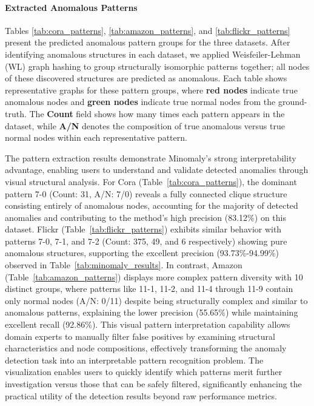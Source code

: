 \documentclass[pdflatex,sn-mathphys-num]{sn-jnl}%
\theoremstyle{thmstyleone}%
\theoremstyle{thmstyletwo}%
\theoremstyle{thmstylethree}%
\begin{document}
\paragraph{Extracted Anomalous Patterns}
Tables \ref{tab:cora_patterns}, \ref{tab:amazon_patterns}, and \ref{tab:flickr_patterns} present the predicted anomalous pattern groups for the three datasets. After identifying anomalous structures in each dataset, we applied Weisfeiler-Lehman (WL) graph hashing to group structurally isomorphic patterns together; all nodes of these discovered structures are predicted as anomalous. Each table shows representative graphs for these pattern groups, where \textbf{red nodes} indicate true anomalous nodes and \textbf{green nodes} indicate true normal nodes from the ground-truth. The \textbf{Count} field shows how many times each pattern appears in the dataset, while \textbf{A/N} denotes the composition of true anomalous versus true normal nodes within each representative pattern.

The pattern extraction results demonstrate Minomaly's strong interpretability advantage, enabling users to understand and validate detected anomalies through visual structural analysis. For Cora (Table~\ref{tab:cora_patterns}), the dominant pattern 7-0 (Count: 31, A/N: 7/0) reveals a fully connected clique structure consisting entirely of anomalous nodes, accounting for the majority of detected anomalies and contributing to the method's high precision (83.12\%) on this dataset. Flickr (Table~\ref{tab:flickr_patterns}) exhibits similar behavior with patterns 7-0, 7-1, and 7-2 (Count: 375, 49, and 6 respectively) showing pure anomalous structures, supporting the excellent precision (93.73\%-94.99\%) observed in Table~\ref{tab:minomaly_results}. In contrast, Amazon (Table~\ref{tab:amazon_patterns}) displays more complex pattern diversity with 10 distinct groups, where patterns like 11-1, 11-2, and 11-4 through 11-9 contain only normal nodes (A/N: 0/11) despite being structurally complex and similar to anomalous patterns, explaining the lower precision (55.65\%) while maintaining excellent recall (92.86\%). This visual pattern interpretation capability allows domain experts to manually filter false positives by examining structural characteristics and node compositions, effectively transforming the anomaly detection task into an interpretable pattern recognition problem. The visualization enables users to quickly identify which patterns merit further investigation versus those that can be safely filtered, significantly enhancing the practical utility of the detection results beyond raw performance metrics.
\end{document}

